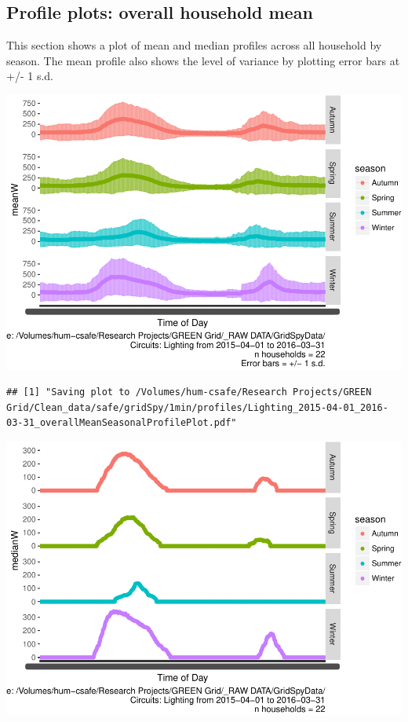 \documentclass[]{article}
\begin{document}
\subsection{Profile plots: overall household
mean}\label{profile-plots-overall-household-mean}

This section shows a plot of mean and median profiles across all
household by season. The mean profile also shows the level of variance
by plotting error bars at +/- 1 s.d.

\includegraphics{nzGGHouseholdPowerDemandProfile_Lighting_2015-04-01_2016-03-31_files/figure-latex/overall profiles by season-1.pdf}

\begin{verbatim}
## [1] "Saving plot to /Volumes/hum-csafe/Research Projects/GREEN Grid/Clean_data/safe/gridSpy/1min/profiles/Lighting_2015-04-01_2016-03-31_overallMeanSeasonalProfilePlot.pdf"
\end{verbatim}

\includegraphics{nzGGHouseholdPowerDemandProfile_Lighting_2015-04-01_2016-03-31_files/figure-latex/overall profiles by season-2.pdf}
\end{document}
